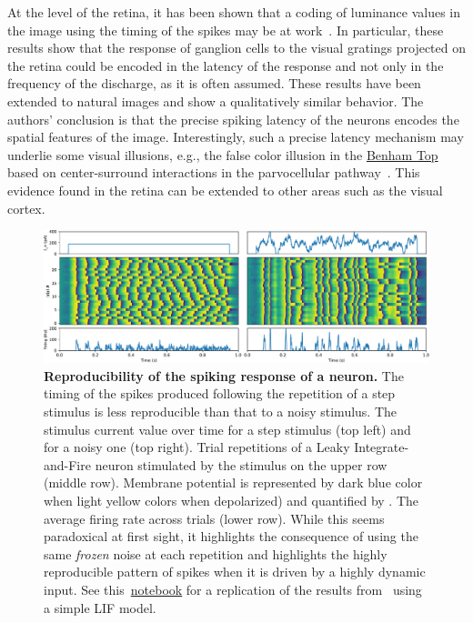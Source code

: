\documentclass[brainsci, %
               review,submit,pdftex,moreauthors
               ]{Definitions/mdpi}
\begin{document}
 At the level of the retina, it has been shown that a coding of luminance values in the image using the timing of the spikes may be at work~\citep{gollisch_rapid_2008}. In particular, these results show that the response of ganglion cells to the visual gratings projected on the retina could be encoded in the latency of the response and not only in the frequency of the discharge, as it is often assumed. These results have been extended to natural images and show a qualitatively similar behavior. The authors' conclusion is that the precise spiking latency of the neurons encodes the spatial features of the image. Interestingly, such a precise latency mechanism may underlie some visual illusions, e.g., the false color illusion in the \href{https://michaelbach.de/ot/col-Benham/index.html}{Benham Top} based on center-surround interactions in the parvocellular pathway~\citep{kenyon_theory_2004}. This evidence found in the retina can be extended to other areas such as the visual cortex.
\begin{figure}
\centering
\includegraphics[width=\textwidth]{figures/replicating_MainenSejnowski1995.pdf} 
\caption{\textbf{Reproducibility of the spiking response of a neuron. }The timing of the spikes produced following the repetition of a step stimulus is less reproducible than that to a noisy stimulus. The stimulus current value over time for a step stimulus (top left) and for a noisy one (top right). Trial repetitions of a Leaky Integrate-and-Fire neuron stimulated by the stimulus on the upper row (middle row). Membrane potential is represented by dark blue color when light yellow colors when depolarized) and quantified by . The average firing rate across trials (lower row). While this seems paradoxical at first sight, it highlights the consequence of using the same \emph{frozen} noise at each repetition and highlights the highly reproducible pattern of spikes when it is driven by a highly dynamic input. See this~\href{https://github.com/laurentperrinet/2022_UE-neurosciences-computationnelles/blob/master/C_MainenSejnowski1995_Perrinet.ipynb}{notebook} for a replication of the results from~\citep{mainen_reliability_1995}  using a simple LIF model.}\label{fig:mainen}
\end{figure}
\end{document}
